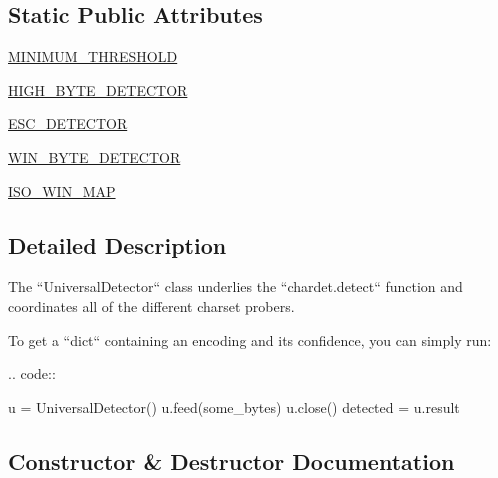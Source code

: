 \subsection*{Static Public Attributes}
\begin{DoxyCompactItemize}
\item 
\hyperlink{classpip_1_1__vendor_1_1chardet_1_1universaldetector_1_1UniversalDetector_ab3fdbb1b58714f4121dc29f1a7a88617}{M\+I\+N\+I\+M\+U\+M\+\_\+\+T\+H\+R\+E\+S\+H\+O\+LD}
\item 
\hyperlink{classpip_1_1__vendor_1_1chardet_1_1universaldetector_1_1UniversalDetector_accded4e9f8a1d0af00274890c04e7d4c}{H\+I\+G\+H\+\_\+\+B\+Y\+T\+E\+\_\+\+D\+E\+T\+E\+C\+T\+OR}
\item 
\hyperlink{classpip_1_1__vendor_1_1chardet_1_1universaldetector_1_1UniversalDetector_a28cc5560720b6bf07a7b12f70ac3b0bd}{E\+S\+C\+\_\+\+D\+E\+T\+E\+C\+T\+OR}
\item 
\hyperlink{classpip_1_1__vendor_1_1chardet_1_1universaldetector_1_1UniversalDetector_a9d29b5cb44a592afb68f4d7f71449318}{W\+I\+N\+\_\+\+B\+Y\+T\+E\+\_\+\+D\+E\+T\+E\+C\+T\+OR}
\item 
\hyperlink{classpip_1_1__vendor_1_1chardet_1_1universaldetector_1_1UniversalDetector_a30dcf26d215737fd3757a346cb0cc614}{I\+S\+O\+\_\+\+W\+I\+N\+\_\+\+M\+AP}
\end{DoxyCompactItemize}


\subsection{Detailed Description}
\begin{DoxyVerb}The ``UniversalDetector`` class underlies the ``chardet.detect`` function
and coordinates all of the different charset probers.

To get a ``dict`` containing an encoding and its confidence, you can simply
run:

.. code::

        u = UniversalDetector()
        u.feed(some_bytes)
        u.close()
        detected = u.result\end{DoxyVerb}
 

\subsection{Constructor \& Destructor Documentation}
\mbox{\label{classpip_1_1__vendor_1_1chardet_1_1universaldetector_1_1UniversalDetector_a9ccb17485411675d89f567aa457baebc}} 
